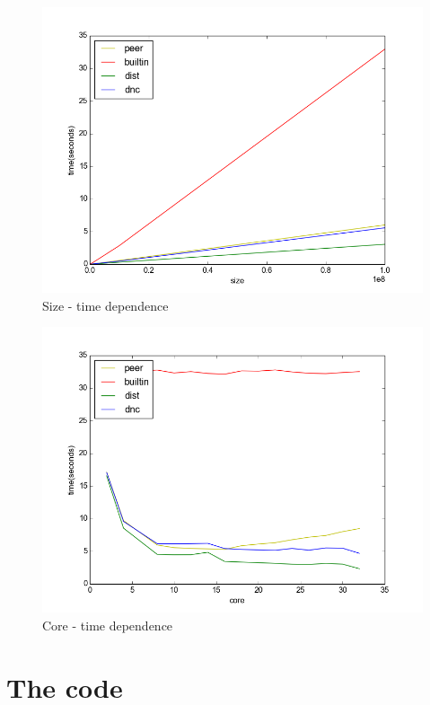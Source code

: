 \documentclass[11pt, a4paper]{scrartcl}
\begin{document}
\begin{figure}
    \centering
    \includegraphics[scale=0.6]{size_time.png}
    \caption{Size - time dependence}
    \label{fig:st}
\end{figure}

\begin{figure}
    \centering
    \includegraphics[scale=0.6]{core_time.png}
    \caption{Core - time dependence}
    \label{fig:ct}
\end{figure}


\section{The code}



\end{document}
